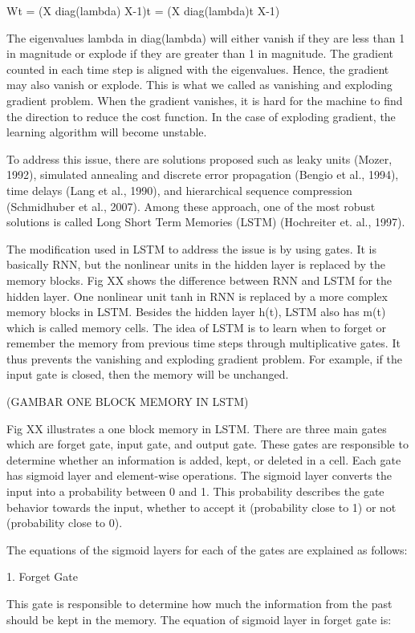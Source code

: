 Wt = (X diag(lambda) X-1)t = (X diag(lambda)t X-1)

The eigenvalues lambda in diag(lambda) will either vanish if they are less than 1 in magnitude or explode if they are greater than 1 in magnitude. The gradient counted in each time step is aligned with the eigenvalues. Hence, the gradient may also vanish or explode. This is what we called as vanishing and exploding gradient problem. When the gradient vanishes, it is hard for the machine to find the direction to reduce the cost function. In the case of exploding gradient, the learning algorithm will become unstable.

To address this issue, there are solutions proposed such as leaky units (Mozer, 1992), simulated annealing and discrete error propagation (Bengio et al., 1994), time delays (Lang et al., 1990), and hierarchical sequence compression (Schmidhuber et al., 2007). Among these approach, one of the most robust solutions is called Long Short Term Memories (LSTM) (Hochreiter et. al., 1997). 

The modification used in LSTM to address the issue is by using gates. It is basically RNN, but the nonlinear units in the hidden layer is replaced by the memory blocks. Fig XX shows the difference between RNN and LSTM for the hidden layer. One nonlinear unit tanh in RNN is replaced by a more complex memory blocks in LSTM. Besides the hidden layer h(t), LSTM also has m(t) which is called memory cells.  The idea of LSTM is to learn when to forget or remember the memory from previous time steps through multiplicative gates. It thus prevents the vanishing and exploding gradient problem. For example, if the input gate is closed, then the memory will be unchanged.

(GAMBAR ONE BLOCK MEMORY IN LSTM)

Fig XX illustrates a one block memory in LSTM. There are three main gates which are forget gate, input gate, and output gate. These gates are responsible to determine whether an information is added, kept, or deleted in a cell. Each gate has sigmoid layer and element-wise operations. The sigmoid layer converts the input into a probability between 0 and 1. This probability describes the gate behavior towards the input, whether to accept it (probability close to 1) or not (probability close to 0). 

The equations of the sigmoid layers for each of the gates are explained as follows:

1. Forget Gate

This gate is responsible to determine how much the information from the past should be kept in the memory. The equation of sigmoid layer in forget gate is:

